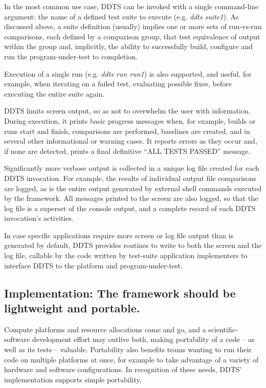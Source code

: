 \documentclass[conference]{IEEEtran}
\begin{document}
In the most common use case, DDTS can be invoked with a single command-line argument: the name of a defined test suite to execute (e.g. \emph{ddts suite1}). As discussed above, a suite definition (usually) implies one or more sets of run-vs-run comparisons, each defined by a comparison group, that test equivalence of output within the group and, implicitly, the ability to successfully build, configure and run the program-under-test to completion.

Execution of a single run (e.g. \emph{ddts run run1}) is also supported, and useful, for example, when iterating on a failed test, evaluating possible fixes, before executing the entire suite again.

DDTS limits screen output, so as not to overwhelm the user with information. During execution, it prints basic progress messages when, for example, builds or runs start and finish, comparisons are performed, baselines are created, and in several other informational or warning cases. It reports errors as they occur and, if none are detected, prints a final definitive ``ALL TESTS PASSED'' message.

Significantly more verbose output is collected in a unique log file created for each DDTS invocation. For example, the results of individual output file comparisons are logged, as is the entire output generated by external shell commands executed by the framework. All messages printed to the screen are also logged, so that the log file is a superset of the console output, and a complete record of each DDTS invocation's activities.

In case specific applications require more screen or log file output than is generated by default, DDTS provides routines to write to both the screen and the log file, callable by the code written by test-suite application implementers to interface DDTS to the platform and program-under-test.

\subsection{Implementation: The framework should be lightweight and portable.}

Compute platforms and resource allocations come and go, and a scientific-software development effort may outlive both, making portability of a code -- as well as its tests -- valuable. Portability also benefits teams wanting to run their code on multiple platforms at once, for example to take advantage of a variety of hardware and software configurations. In recognition of these needs, DDTS' implementation supports simple portability.
\end{document}

